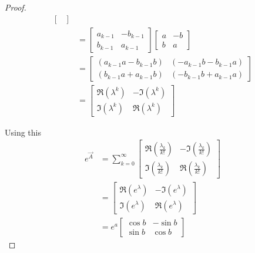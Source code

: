 \begin{proof}
\begin{align*}
\begin{bmatrix}
		\end{bmatrix} \\
		&= 
		\begin{bmatrix}
			a_{k - 1} & -b_{k - 1} \\
			b_{k - 1} & a_{k - 1}
		\end{bmatrix}
		\begin{bmatrix}
			a & -b \\
			b & a
		\end{bmatrix} \\
		&=
		\begin{bmatrix}
			(a_{k - 1}a - b_{k - 1}b) & (-a_{k - 1}b - b_{k - 1}a) \\
			(b_{k - 1}a + a_{k - 1}b) & (-b_{k - 1}b + a_{k - 1}a)
		\end{bmatrix} \\
		&=
		\begin{bmatrix}
			\Re(\lambda^k)	& -\Im(\lambda^k) \\
			\Im(\lambda^k)	& \Re(\lambda^k)
		\end{bmatrix}
	\end{align*}

	Using this
	\begin{align*}
		e^{\vec A}
		&=
		\sum_{k = 0}^\infty
		\begin{bmatrix}
			\Re(\frac{\lambda_k}{k!})	& -\Im(\frac{\lambda_k}{k!}) \\
			\Im(\frac{\lambda_k}{k!})	& \Re(\frac{\lambda_k}{k!})
		\end{bmatrix} \\
		&=
		\begin{bmatrix}
			\Re(e^\lambda)	& -\Im(e^\lambda) \\
			\Im(e^\lambda)	& \Re(e^\lambda)
		\end{bmatrix} \\
		&=
		e^a
		\begin{bmatrix}
			\cos b 	& -\sin b \\
			\sin b 	& \cos b
		\end{bmatrix}
	\end{align*}
\end{proof}

